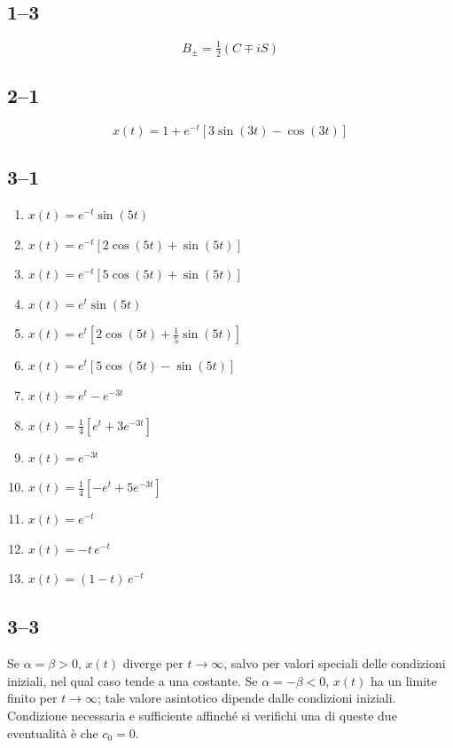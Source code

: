\documentclass[11pt, a4paper]{book}
\numberwithin{equation}{section}
\begin{document}
\subsection*{1--3}
\[
    B_\pm = \tfrac{1}{2}(C \mp i S)
\]

\subsection*{2--1}
\[
    x(t) = 1 + e^{-t} \left[ 3\sin(3t) - \cos(3t) \right]
\]

\subsection*{3--1}
\begin{enumerate}
    \item $x(t) = e^{-t}\sin(5t)$
    \item $x(t) = e^{-t}\left[ 2\cos(5t) + \sin(5t) \right]$
    \item $x(t) = e^{-t}\left[ 5\cos(5t) + \sin(5t) \right]$
    \item $x(t) = e^{t}\sin(5t)$
    \item $x(t) = e^{t}\left[ 2\cos(5t) + \tfrac{1}{5}\sin(5t) \right]$
    \item $x(t) = e^{t}\left[ 5\cos(5t) - \sin(5t) \right]$
    \item $x(t) = e^{t} - e^{-3t}$
    \item $x(t) = \tfrac{1}{4}\left[ e^{t} + 3e^{-3t} \right]$
    \item $x(t) = e^{-3t}$
    \item $x(t) = \tfrac{1}{4}\left[ -e^{t} + 5e^{-3t} \right]$
    \item $x(t) = e^{-t}$
    \item $x(t) = -t \, e^{-t}$
    \item $x(t) = (1-t) \, e^{-t}$
\end{enumerate}

\subsection*{3--3}
Se $\alpha = \beta > 0$, $x(t)$ diverge per $t \to \infty$, salvo per valori speciali delle
condizioni iniziali, nel qual caso tende a una costante. Se $\alpha = -\beta < 0$,
$x(t)$ ha un limite finito per $t \to \infty$; tale valore asintotico dipende dalle
condizioni iniziali. Condizione necessaria e sufficiente affinché si verifichi
una di queste due eventualità è che $c_0 = 0$.
\end{document}
